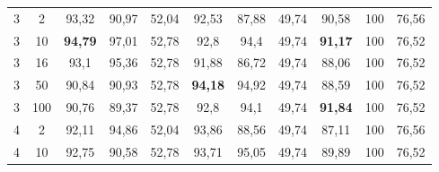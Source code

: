 \begin{table}[ht]
\begin{tabular}{cc|ccc|ccc|ccc}
        {3}                           & {2}     & {93,32}                             & {90,97}                             & {52,04}                                   & {92,53}                         & {87,88}                         & {49,74}                        & {90,58}                         & {100}                           & {76,56}                        \\
        {3}                           & {10}    & \textbf{{94,79}}                    & {97,01}                             & {52,78}                                   & {92,8}                          & {94,4}                          & {49,74}                        & \textbf{91,17}                  & {100}                           & {76,52}                        \\
        {3}                           & {16}    & {93,1}                              & {95,36}                             & {52,78}                                   & {91,88}                         & {86,72}                         & {49,74}                        & {88,06}                         & {100}                           & {76,52}                        \\
        {3}                           & {50}    & {90,84}                             & {90,93}                             & {52,78}                                   & \textbf{94,18}                  & {94,92}                         & {49,74}                        & {88,59}                         & {100}                           & {76,52}                        \\
        {3}                           & {100}   & {90,76}                             & {89,37}                             & {52,78}                                   & {92,8}                          & {94,1}                          & {49,74}                        & \textbf{91,84}                  & {100}                           & {76,52}                        \\
        {4}                           & {2}     & {92,11}                             & {94,86}                             & {52,04}                                   & {93,86}                         & {88,56}                         & {49,74}                        & {87,11}                         & {100}                           & {76,56}                        \\
        {4}                           & {10}    & {92,75}                             & {90,58}                             & {52,78}                                   & {93,71}                         & {95,05}                         & {49,74}                        & {89,89}                         & {100}                           & {76,52}                        \\

\end{tabular}
\end{table}
